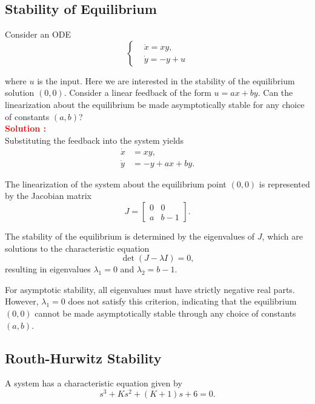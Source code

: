 \documentclass[12pt]{article}
\begin{document}
\clearpage
\subsection{Stability of Equilibrium}

Consider an ODE 
\begin{equation}
    \begin{cases}
        &\dot{x} = xy, \\
        &\dot{y} = -y + u
    \end{cases}
\end{equation}


where \(u\) is the input. Here we are interested in the stability of the equilibrium solution \((0,0)\). Consider a linear feedback of the form \(u = ax + by\). Can the linearization about the equilibrium be made asymptotically stable for any choice of constants \((a,b)\)?\\

\textbf{\textcolor{red}{Solution :}} \\
Substituting the feedback into the system yields
\begin{align*}
    \dot{x} &= xy, \\
    \dot{y} &= -y + ax + by.
\end{align*}

The linearization of the system about the equilibrium point \((0,0)\) is represented by the Jacobian matrix
\[
J = \begin{bmatrix}
    0 & 0 \\
    a & b-1
\end{bmatrix}.
\]

The stability of the equilibrium is determined by the eigenvalues of \(J\), which are solutions to the characteristic equation
\[
\det(J - \lambda I) = 0,
\]
resulting in eigenvalues \(\lambda_1 = 0\) and \(\lambda_2 = b-1\).

For asymptotic stability, all eigenvalues must have strictly negative real parts. However, \(\lambda_1 = 0\) does not satisfy this criterion, indicating that the equilibrium \((0,0)\) cannot be made asymptotically stable through any choice of constants \((a,b)\).

\clearpage
\subsection{Routh-Hurwitz Stability}


A system has a characteristic equation given by
\begin{equation}
    s^3 + Ks^2 + (K+1)s + 6 = 0.
\end{equation}
\end{document}
